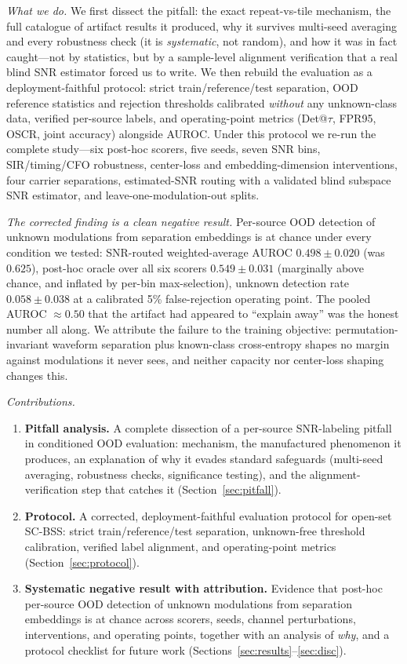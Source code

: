 \documentclass[review,12pt]{elsarticle}
\begin{document}
\emph{What we do.} We first dissect the pitfall: the exact
repeat-vs-tile mechanism, the full catalogue of artifact results it
produced, why it survives multi-seed averaging and every robustness
check (it is \emph{systematic}, not random), and how it was in fact
caught---not by statistics, but by a sample-level alignment
verification that a real blind SNR estimator forced us to write. We
then rebuild the evaluation as a deployment-faithful protocol: strict
train/reference/test separation, OOD reference statistics and rejection
thresholds calibrated \emph{without} any unknown-class data, verified
per-source labels, and operating-point metrics (Det@$\tau$, FPR95,
OSCR, joint accuracy) alongside AUROC\@. Under this protocol we re-run
the complete study---six post-hoc scorers, five seeds, seven SNR bins,
SIR/timing/CFO robustness, center-loss and embedding-dimension
interventions, four carrier separations, estimated-SNR routing with a
validated blind subspace SNR estimator, and leave-one-modulation-out
splits.

\emph{The corrected finding is a clean negative result.} Per-source OOD
detection of unknown modulations from separation embeddings is at
chance under every condition we tested: SNR-routed weighted-average
AUROC $0.498 \pm 0.020$ (was $0.625$), post-hoc oracle over all six
scorers $0.549 \pm 0.031$ (marginally above chance, and inflated by
per-bin max-selection), unknown detection rate $0.058 \pm 0.038$ at a
calibrated 5\% false-rejection operating point. The pooled AUROC
$\approx 0.50$ that the artifact had appeared to ``explain away'' was
the honest number all along. We attribute the failure to the training
objective: permutation-invariant waveform separation plus known-class
cross-entropy shapes no margin against modulations it never sees, and
neither capacity nor center-loss shaping changes this.

\emph{Contributions.}
\begin{enumerate}
  \item \textbf{Pitfall analysis.} A complete dissection of a
        per-source SNR-labeling pitfall in conditioned OOD evaluation:
        mechanism, the manufactured phenomenon it produces, an
        explanation of why it evades standard safeguards (multi-seed
        averaging, robustness checks, significance testing), and the
        alignment-verification step that catches it
        (Section~\ref{sec:pitfall}).
  \item \textbf{Protocol.} A corrected, deployment-faithful evaluation
        protocol for open-set SC-BSS: strict train/reference/test
        separation, unknown-free threshold calibration, verified
        label alignment, and operating-point metrics
        (Section~\ref{sec:protocol}).
  \item \textbf{Systematic negative result with attribution.} Evidence
        that post-hoc per-source OOD detection of unknown modulations
        from separation embeddings is at chance across scorers, seeds,
        channel perturbations, interventions, and operating points,
        together with an analysis of \emph{why}, and a protocol
        checklist for future work
        (Sections~\ref{sec:results}--\ref{sec:disc}).
\end{enumerate}
\end{document}
